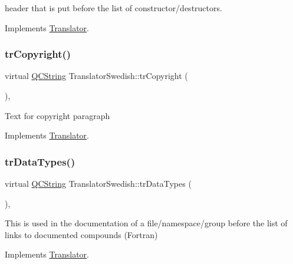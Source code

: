 header that is put before the list of constructor/destructors. 

Implements \mbox{\hyperlink{class_translator}{Translator}}.

\mbox{\label{class_translator_swedish_a8f51dd990310b056bc07845868068aa4}} 
\subsubsection{\texorpdfstring{trCopyright()}{trCopyright()}}
{\footnotesize\ttfamily virtual \mbox{\hyperlink{class_q_c_string}{Q\+C\+String}} Translator\+Swedish\+::tr\+Copyright (\begin{DoxyParamCaption}{ }\end{DoxyParamCaption})\hspace{0.3cm}{\ttfamily [inline]}, {\ttfamily [virtual]}}

Text for copyright paragraph 

Implements \mbox{\hyperlink{class_translator}{Translator}}.

\mbox{\label{class_translator_swedish_a206d6a81bee9089bf8e5aceba90d187a}} 
\subsubsection{\texorpdfstring{trDataTypes()}{trDataTypes()}}
{\footnotesize\ttfamily virtual \mbox{\hyperlink{class_q_c_string}{Q\+C\+String}} Translator\+Swedish\+::tr\+Data\+Types (\begin{DoxyParamCaption}{ }\end{DoxyParamCaption})\hspace{0.3cm}{\ttfamily [inline]}, {\ttfamily [virtual]}}

This is used in the documentation of a file/namespace/group before the list of links to documented compounds (Fortran) 

Implements \mbox{\hyperlink{class_translator}{Translator}}.

\mbox{\label{class_translator_swedish_ac8be7073c5ea39485a5ce7fbe2c87628}} 
